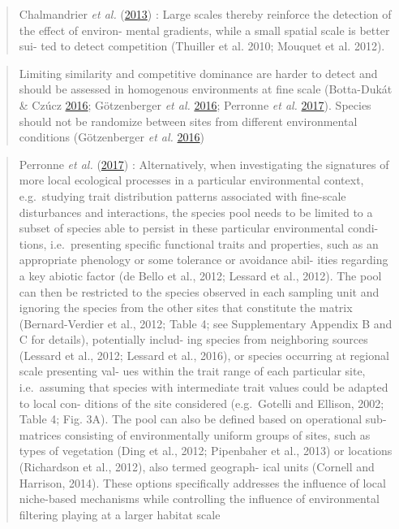 \documentclass[]{article}
\begin{document}
\begin{quote}
Chalmandrier \emph{et al.}
(\protect\hyperlink{ref-chalmandrier2013}{2013}) : Large scales thereby
reinforce the detection of the effect of environ- mental gradients,
while a small spatial scale is better sui- ted to detect competition
(Thuiller et al. 2010; Mouquet et al. 2012).
\end{quote}

\begin{quote}
Limiting similarity and competitive dominance are harder to detect and
should be assessed in homogenous environments at fine scale (Botta-Dukát
\& Czúcz \protect\hyperlink{ref-botta_dukat2016}{2016}; Götzenberger
\emph{et al.}
\protect\hyperlink{ref-gotzenberger2016randomizations}{2016}; Perronne
\emph{et al.} \protect\hyperlink{ref-perronne2017}{2017}). Species
should not be randomize between sites from different environmental
conditions (Götzenberger \emph{et al.}
\protect\hyperlink{ref-gotzenberger2016randomizations}{2016})
\end{quote}

\begin{quote}
Perronne \emph{et al.} (\protect\hyperlink{ref-perronne2017}{2017}) :
Alternatively, when investigating the signatures of more local
ecological processes in a particular environmental context,
e.g.~studying trait distribution patterns associated with fine-scale
disturbances and interactions, the species pool needs to be limited to a
subset of species able to persist in these particular environmental
condi- tions, i.e.~presenting specific functional traits and properties,
such as an appropriate phenology or some tolerance or avoidance abil-
ities regarding a key abiotic factor (de Bello et al., 2012; Lessard et
al., 2012). The pool can then be restricted to the species observed in
each sampling unit and ignoring the species from the other sites that
constitute the matrix (Bernard-Verdier et al., 2012; Table 4; see
Supplementary Appendix B and C for details), potentially includ- ing
species from neighboring sources (Lessard et al., 2012; Lessard et al.,
2016), or species occurring at regional scale presenting val- ues within
the trait range of each particular site, i.e.~assuming that species with
intermediate trait values could be adapted to local con- ditions of the
site considered (e.g.~Gotelli and Ellison, 2002; Table 4; Fig. 3A). The
pool can also be defined based on operational sub- matrices consisting
of environmentally uniform groups of sites, such as types of vegetation
(Ding et al., 2012; Pipenbaher et al., 2013) or locations (Richardson et
al., 2012), also termed geograph- ical units (Cornell and Harrison,
2014). These options specifically addresses the influence of local
niche-based mechanisms while controlling the influence of environmental
filtering playing at a larger habitat scale
\end{quote}
\end{document}
